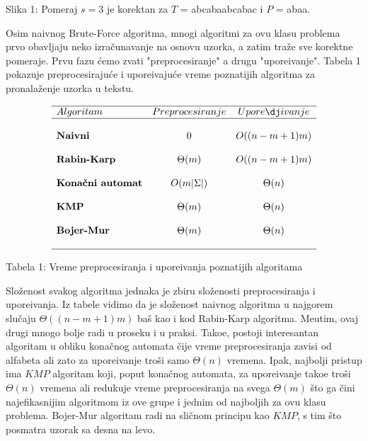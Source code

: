 \documentclass[a4paper,12pt]{article}
\begin{document}
\begin{center}
Slika 1: Pomeraj $s = 3$ je korektan za $T$ = abcabaabcabac i $P$ = abaa.
\end{center}

Osim naivnog Brute-Force algoritma, mnogi algoritmi za ovu klasu problema prvo obavljaju neko izra\v cunavanje na osnovu uzorka, a zatim tra\v ze sve korektne pomeraje. Prvu fazu \' cemo zvati "preprocesiranje" a drugu "upore\dj ivanje". Tabela 1 pokazuje preprocesiraju\' ce i upore\dj ivaju\' ce vreme poznatijih algoritma za pronala\v zenje uzorka u tekstu.

\begin{center}
\begin{displaymath}
\begin{array}{lcc}
\hline Algoritam & Preprocesiranje & Upore\dj ivanje \\
\hline & & \\
\textbf{Naivni} & 0 & O((n-m+1)m) \\
& & \\
\textbf{Rabin-Karp} & \Theta(m) & O((n-m+1)m)  \\
& & \\
\textbf{Kona\v cni automat} & O(m|\Sigma|) & \Theta(n) \\
& & \\
\textbf{KMP} & \Theta(m) & \Theta(n) \\
& & \\
\textbf{Bojer-Mur} & \Theta(m) & \Theta(n) \\
& & \\
\hline
\end{array}
\end{displaymath}
\end{center}

\begin{center}
Tabela 1: Vreme preprocesiranja i upore\dj ivanja poznatijih algoritama
\end{center}

Slo\v zenost svakog algoritma jednaka je zbiru slo\v zenosti preprocesiranja i upore\dj ivanja. Iz tabele vidimo da je slo\v zenost naivnog algoritma u najgorem slu\v caju $\Theta((n-m+1)m)$ ba\v s kao i kod Rabin-Karp algoritma. Me\dj utim, ovaj drugi mnogo bolje radi u proseku i u praksi. Tako\dj e, postoji interesantan algoritam u obliku kona\v cnog automata \v cije vreme preprocesiranja zavisi od alfabeta ali zato za upore\dj ivanje tro\v si samo $\Theta(n)$ vremena. Ipak, najbolji pristup ima $KMP$ algoritam koji, poput kona\v cnog automata, za upore\dj ivanje tako\dj e tro\v si $\Theta(n)$ vremena ali redukuje vreme preprocesiranja na svega $\Theta(m)$ \v sto ga \v cini najefikasnijim algoritmom iz ove grupe i jednim od najboljih za ovu klasu problema. Bojer-Mur algoritam radi na sli\v cnom principu kao $KMP$, s tim \v sto posmatra uzorak sa desna na levo.
\end{document}
